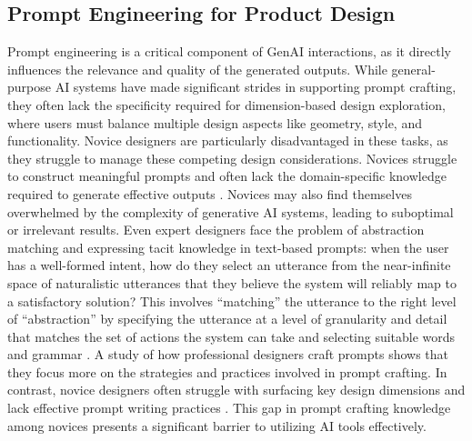 \subsection{Prompt Engineering for Product Design}
Prompt engineering is a critical component of GenAI interactions, as it directly influences the relevance and quality of the generated outputs. While general-purpose AI systems have made significant strides in supporting prompt crafting, they often lack the specificity required for dimension-based design exploration, where users must balance multiple design aspects like geometry, style, and functionality. Novice designers are particularly disadvantaged in these tasks, as they struggle to manage these competing design considerations. Novices struggle to construct meaningful prompts and often lack the domain-specific knowledge required to generate effective outputs \cite{zamfirescu2023johnny, palani2021active, palani2024evolving}. Novices may also find themselves overwhelmed by the complexity of generative AI systems, leading to suboptimal or irrelevant results. Even expert designers face the problem of abstraction matching and expressing tacit knowledge in text-based prompts: when the user has a well-formed intent, how do they select an utterance from the near-infinite space of naturalistic utterances that they believe the system will reliably map to a satisfactory solution? This involves “matching” the utterance to the right level of “abstraction” by specifying the utterance at a level of granularity and detail that matches the set of actions the system can take and selecting suitable words and grammar \cite{liu2023wants}. A study of how professional designers craft prompts shows that they focus more on the strategies and practices involved in prompt crafting. In contrast, novice designers often struggle with surfacing key design dimensions and lack effective prompt writing practices \cite{chong2024prompting}. This gap in prompt crafting knowledge among novices presents a significant barrier to utilizing AI tools effectively.

